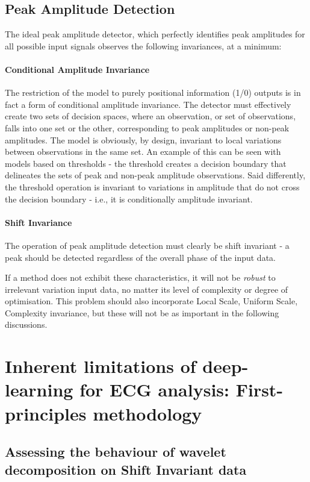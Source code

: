 \documentclass[9pt,conference]{IEEEtran}
\begin{document}
\subsection{Peak Amplitude Detection}

The ideal peak amplitude detector, which perfectly identifies peak amplitudes for all possible input signals observes the following invariances, at a minimum:

\paragraph{Conditional Amplitude Invariance}
The restriction of the model to purely positional information (1/0) outputs is in fact a form of conditional amplitude invariance. The detector must effectively create two sets of decision spaces, where an observation, or set of observations, falls into one set or the other, corresponding to peak amplitudes or non-peak amplitudes. The model is obviously, by design, invariant to local variations between observations in the same set. An example of this can be seen with models based on thresholds - the threshold creates a decision boundary that delineates the sets of peak and non-peak amplitude observations. Said differently, the threshold operation is invariant to variations in amplitude that do not cross the decision boundary - i.e., it is conditionally amplitude invariant.

\paragraph{Shift Invariance}
The operation of peak amplitude detection must clearly be shift invariant - a peak should be detected regardless of the overall phase of the input data.

If a method does not exhibit these characteristics, it will not be \textit{robust} to irrelevant variation input data, no matter its level of complexity or degree of optimisation. This problem should also incorporate Local Scale, Uniform Scale, Complexity invariance, but these will not be as important in the following discussions.

\section{ Inherent limitations of deep-learning for ECG analysis: First-principles methodology}


\subsection{Assessing the behaviour of wavelet decomposition on Shift Invariant data}
\end{document}

